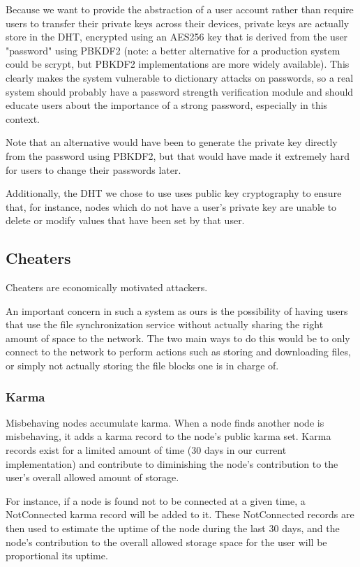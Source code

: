 \documentclass{acm_}
\begin{document}
Because we want to provide the abstraction of a user account rather than require users to transfer their private keys across their devices, private keys are actually store in the DHT, encrypted using an AES256 key that is derived from the user "password" using PBKDF2\cite{PBKDF2} (note: a better alternative for a production system could be scrypt\cite{scrypt}, but PBKDF2 implementations are more widely available). This clearly makes the system vulnerable to dictionary attacks on passwords, so a real system should probably have a password strength verification module and should educate users about the importance of a strong password, especially in this context.

Note that an alternative would have been to generate the private key directly from the password using PBKDF2, but that would have made it extremely hard for users to change their passwords later.

Additionally, the DHT we chose to use uses public key cryptography to ensure that, for instance, nodes which do not have a user's private key are unable to delete or modify values that have been set by that user. 

\subsection{Cheaters}

Cheaters are economically motivated attackers.

An important concern in such a system as ours is the possibility of having users that use the file synchronization service without actually sharing the right amount of space to the network. The two main ways to do this would be to only connect to the network to perform actions such as storing and downloading files, or simply not actually storing the file blocks one is in charge of. 

\subsubsection{Karma}

Misbehaving nodes accumulate karma. When a node finds another node is misbehaving, it adds a karma record to the node's public karma set. Karma records exist for a limited amount of time (30 days in our current implementation) and contribute to diminishing the node's contribution to the user's overall allowed amount of storage.

For instance, if a node is found not to be connected at a given time, a NotConnected karma record will be added to it. These NotConnected records are then used to estimate the uptime of the node during the last 30 days, and the node's contribution to the overall allowed storage space for the user will be proportional its uptime. 
\end{document}
